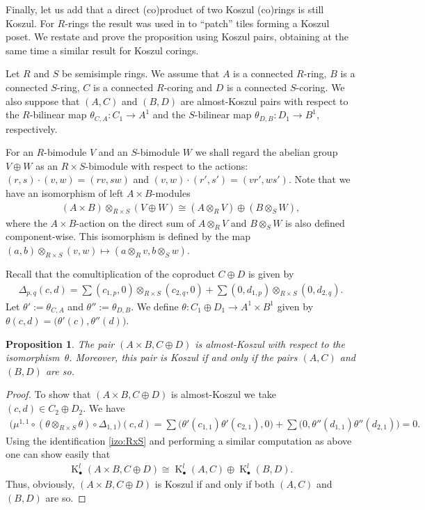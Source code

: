 \documentclass[pdftex]{sigma}
\DeclareMathOperator{\K}{K}
\newcommand\ot{\otimes}
\renewcommand{\^}[1]{\mbox{$^{\left( #1 \right)}$}}
\renewcommand{\_}[1]{\mbox{$_{\left( #1 \right)}$}}
\numberwithin{equation}{section}
\newtheorem{Proposition}[Theorem]{Proposition}
{ \theoremstyle{definition}
\newtheorem{Definition}[Theorem]{Definition}
\newtheorem{Remark}[Theorem]{Remark}
}
\begin{document}
Finally, let us add that a direct (co)product of two Koszul (co)rings is still Koszul. For $R$-rings the result was used in \cite[Section~2.10]{mst} to ``patch'' tiles forming a Koszul poset. We restate and prove the proposition using Koszul pairs, obtaining at the same time a similar result for Koszul corings.

Let $R$ and $S$ be semisimple rings. We assume that $A$ is a connected $R$-ring, $B$ is a connected $S$-ring, $C$ is a connected $R$-coring and $D$ is a connected $S$-coring. We also suppose that $(A,C)$ and $(B,D)$ are almost-Koszul pairs with respect to the $R$-bilinear map $\theta_{C,A}\colon C_1\to A^1$ and the $S$-bilinear map $\theta_{D,B}\colon D_1\to B^1$, respectively.

For an $R$-bimodule $V$ and an $S$-bimodule $W$ we shall regard the abelian group $V\oplus W$ as an $R\times S$-bimodule with respect to the actions: $(r,s)\cdot(v,w)=(rv,sw)$ and $(v,w)\cdot(r',s')=(vr',ws')$.
Note that we have an isomorphism of left $A\times B$-modules
\begin{gather}\label{izo:RxS}
 (A\times B)\ot_{R\times S}(V\oplus W)\cong (A\otimes_R V)\oplus(B\ot_S W),
\end{gather}
where the $A\times B$-action on the direct sum of $A\otimes_R V$ and $B\ot_S W$ is also def\/ined component-wise. This isomorphism is def\/ined by the map $(a,b)\ot_{R\times S}(v,w) \mapsto(a\ot_R v, b\ot_S w)$.

Recall that the comultiplication of the coproduct $C\oplus D$ is given by
\begin{gather*}
 \Delta_{p,q}(c,d)=\sum(c_{1,p},0)\ot_{R\times S}(c_{2,q},0)+\sum (0,d_{1,p})\ot_{R\times S}(0,d_{2,q}).
\end{gather*}
Let $\theta':=\theta_{C,A}$ and $\theta'':=\theta_{D,B}$. We def\/ine $\theta\colon C_1\oplus D_1\to A^1\times B^1$ given by $\theta(c,d)=\big(\theta'(c),\theta''(d)\big)$.
\begin{Proposition} \label{suma_koszul}
The pair $(A\times B,C\oplus D)$ is almost-Koszul with respect to the isomor\-phism~$\theta$. Moreover, this pair is Koszul if and only if the pairs $(A,C)$ and $(B,D)$ are so.
\end{Proposition}

\begin{proof}
To show that $(A\times B,C\oplus D)$ is almost-Koszul we take $(c,d)\in C_2\oplus D_2 $. We have
\begin{gather*}
 \big(\mu^{1,1}\circ (\theta\ot_{R\times S}\theta)\circ\Delta_{1,1}\big)(c,d)=\sum\big(\theta'(c_{1,1})\theta'( c_{2,1}),0\big)+\sum \big(0,\theta''( d_{1,1})\theta''(d_{2,1})\big)=0.
\end{gather*}
Using the identif\/ication \eqref{izo:RxS} and performing a similar computation as above one can show easily that
\begin{gather*}
 \K_\bullet^l(A\times B, C\oplus D)\cong \K_\bullet^l(A,C)\oplus \K_\bullet^l(B,D).
\end{gather*}
Thus, obviously, $(A \times B, C \oplus D)$ is Koszul if and only if both $(A,C)$ and $(B,D)$ are so.
\end{proof}
\end{document}
